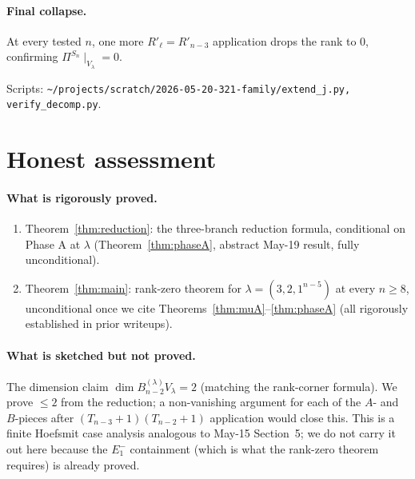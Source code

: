 \documentclass[11pt]{article}
\theoremstyle{definition}
\begin{document}
\paragraph{Final collapse.}  At every tested $n$, one more
$R'_{\ell}=R'_{n-3}$ application drops the rank to $0$, confirming
$\Pi^{S_n}\!\mid_{V_\lambda}=0$.

Scripts: \texttt{\textasciitilde/projects/scratch/2026-05-20-321-family/extend\_j.py,
verify\_decomp.py}.

\section{Honest assessment}\label{sec:honest}

\paragraph{What is rigorously proved.}
\begin{enumerate}[leftmargin=2em,topsep=0.3em,itemsep=0.2em]
\item Theorem~\ref{thm:reduction}: the three-branch reduction
formula, conditional on Phase A at $\lambda$
(Theorem~\ref{thm:phaseA}, abstract May-19 result, fully
unconditional).
\item Theorem~\ref{thm:main}: rank-zero theorem for
$\lambda=(3,2,1^{n-5})$ at every $n\ge 8$, unconditional once we
cite Theorems~\ref{thm:muA}--\ref{thm:phaseA} (all rigorously
established in prior writeups).
\end{enumerate}

\paragraph{What is sketched but not proved.}
The dimension claim $\dim B_{n-2}^{(\lambda)} V_\lambda=2$ (matching
the rank-corner formula).  We prove $\le 2$ from the reduction; a
non-vanishing argument for each of the $A$- and $B$-pieces after
$(T_{n-3}{+}1)(T_{n-2}{+}1)$ application would close this.  This is
a finite Hoefsmit case analysis analogous to May-15
Section~5; we do not carry it out here because the $E_1^-$
containment (which is what the rank-zero theorem requires) is
already proved.
\end{document}

